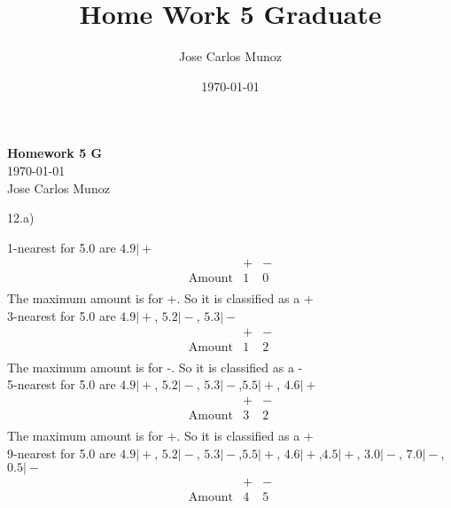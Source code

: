 \documentclass[12pt,english]{article}
\title{Home Work 5 Graduate}
\date{\today}
\author{Jose Carlos Munoz}
\begin{document}
\begin{center}
    \Large
    \textbf{Homework 5 G}\\
    \small
    \today\\
    \large
    Jose Carlos Munoz
\end{center}%
\par
12.a)\\
\par
1-nearest for 5.0 are $4.9 \vert +$
\begin{equation*}
\begin{array}{c|cc}
              & + & - \\
\hline          
\mbox{Amount} & 1 & 0 \\
\end{array}
\end{equation*}
The maximum amount is for +. So it is classified as a +\\
3-nearest for 5.0 are $4.9 \vert +$, $5.2 \vert -$, $5.3 \vert -$
\begin{equation*}
\begin{array}{c|cc}
              & + & - \\
\hline          
\mbox{Amount} & 1 & 2 \\
\end{array}
\end{equation*}
The maximum amount is for -. So it is classified as a -\\
5-nearest for 5.0 are $4.9 \vert +$, $5.2 \vert -$, $5.3 \vert -$,$5.5 \vert +$, $4.6 \vert +$
\begin{equation*}
\begin{array}{c|cc}
              & + & - \\
\hline          
\mbox{Amount} & 3 & 2 \\
\end{array}
\end{equation*}
The maximum amount is for +. So it is classified as a +\\
9-nearest for 5.0 are $4.9 \vert +$, $5.2 \vert -$, $5.3 \vert -$,$5.5 \vert +$, $4.6 \vert +$,$4.5 \vert +$, $3.0 \vert -$, $7.0 \vert -$,$0.5 \vert -$
\begin{equation*}
\begin{array}{c|cc}
              & + & - \\
\hline          
\mbox{Amount} & 4 & 5 \\
\end{array}
\end{equation*}
\end{document}
